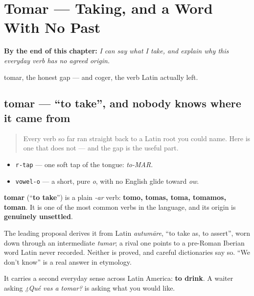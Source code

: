 
\chapter{Tomar — Taking, and a Word With No Past}
\label{ch:spanish-tomar}

\begin{chapteropening}
\textbf{By the end of this chapter:} \emph{I can say what I take, and explain why this everyday verb has no agreed origin.}

tomar, the honest gap — and coger, the verb Latin actually left.
\end{chapteropening}

\section[tomar]{tomar — \textquotedblleft{}to take\textquotedblright{}, and nobody knows where it came from}

\label{lesson:ES-C35-tomar}



\begin{quote}
Every verb so far ran straight back to a Latin root you could name. Here is one that does not — and the gap is the useful part.
\end{quote}

\begin{sounds}
\begin{itemize}
\raggedright
  \item \texttt{r-tap} — one soft tap of the tongue: \emph{to-MAR}.
  \item \texttt{vowel-o} — a short, pure \emph{o}, with no English glide toward \emph{ow}.
\end{itemize}
\end{sounds}

\begin{cousinweb}
\textbf{tomar} (\textquotedblleft{}\textbf{to take}\textquotedblright{}) is a plain \emph{-ar} verb: \textbf{tomo, tomas, toma, tomamos, toman}. It is one of the most common verbs in the language, and its origin is \textbf{genuinely unsettled}.

The leading proposal derives it from Latin \emph{autumāre}, \textquotedblleft{}to take as, to assert\textquotedblright{}, worn down through an intermediate \emph{tumar}; a rival one points to a pre-Roman Iberian word Latin never recorded. Neither is proved, and careful dictionaries say so. \textquotedblleft{}We don't know\textquotedblright{} is a real answer in etymology.

It carries a second everyday sense across Latin America: \textbf{to drink}. A waiter asking \emph{¿Qué vas a tomar?} is asking what you would like.
\end{cousinweb}

